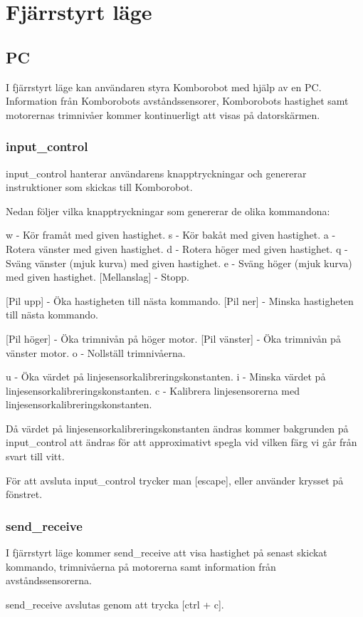 
%
%


\section{Fjärrstyrt läge}
\subsection{PC}
I fjärrstyrt läge kan användaren styra Komborobot med hjälp av en PC.
Information från Komborobots avståndssensorer, Komborobots hastighet samt
motorernas trimnivåer kommer kontinuerligt att visas på datorskärmen.
\subsubsection{input\_control}
input\_control hanterar användarens knapptryckningar och genererar instruktioner
som skickas till Komborobot.

Nedan följer vilka knapptryckningar som genererar de olika kommandona:

w - Kör framåt med given hastighet.
s - Kör bakåt med given hastighet.
a - Rotera vänster med given hastighet.
d - Rotera höger med given hastighet.
q - Sväng vänster (mjuk kurva) med given hastighet.
e - Sväng höger (mjuk kurva) med given hastighet.
[Mellanslag] - Stopp.

[Pil upp] - Öka hastigheten till nästa kommando.
[Pil ner] - Minska hastigheten till nästa kommando.

[Pil höger] - Öka trimnivån på höger motor.
[Pil vänster] - Öka trimnivån på vänster motor.
o - Nollställ trimnivåerna.

u - Öka värdet på linjesensorkalibreringskonstanten.
i - Minska värdet på linjesensorkalibreringskonstanten.
c - Kalibrera linjesensorerna med linjesensorkalibreringskonstanten.

Då värdet på linjesensorkalibreringskonstanten ändras kommer bakgrunden på
input\_control att ändras för att approximativt spegla vid vilken färg vi går
från svart till vitt.

För att avsluta input\_control trycker man [escape], eller använder krysset på
fönstret.

\subsubsection{send\_receive}
I fjärrstyrt läge kommer send\_receive att visa hastighet på senast skickat
kommando, trimnivåerna på motorerna samt information från avståndssensorerna.

send\_receive avslutas genom att trycka [ctrl + c].
